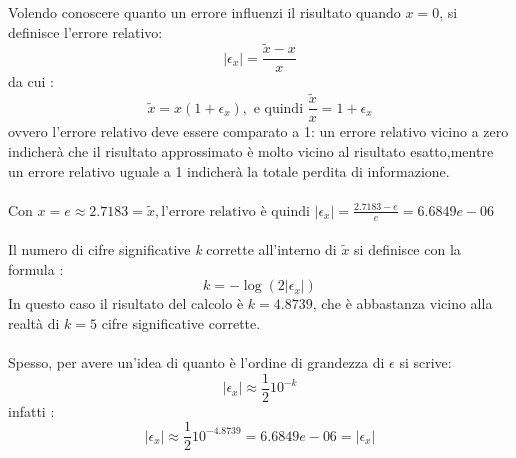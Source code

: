Volendo conoscere quanto un errore influenzi il risultato quando $x=0$, si definisce l’errore relativo:
	\[
	|\epsilon_x| = \frac{\tilde{x}-x}{x} 
	\]
da cui :
	\[
	\tilde{x} = x(1+\epsilon_x), \text{ e quindi } \frac{\tilde{x}}{x} = 1 + \epsilon_x
	\]
ovvero l’errore relativo deve essere comparato a 1: un errore relativo vicino a zero indicherà che il risultato approssimato è molto vicino al risultato esatto,mentre un errore relativo uguale a 1 indicherà la totale perdita di informazione.\\\\
Con $x = e \approx 2.7183 = \tilde{x}, \text{l'errore relativo è quindi } |\epsilon_x| = \frac{2.7183 - e}{e} = 6.6849e-06$\\\\
Il numero di cifre significative \textit{k} corrette all’interno di $\tilde{x}$ si definisce con la formula :
	\[
	\textit{k} = -\log(2|\epsilon_x|)
	\]
In questo caso il risultato del calcolo è $\textit{k}=4.8739$, che è abbastanza vicino alla realtà di $\textit{k}=5$ cifre significative corrette.\\\\
Spesso, per avere un’idea di quanto è l’ordine di grandezza di $\epsilon$ si scrive:
	\[
	|\epsilon_x| \approx \frac{1}{2}10^{-\textit{k}}
	\]
infatti : 
	\[
	|\epsilon_x| \approx \frac{1}{2}10^{-4.8739} = 6.6849e-06 = |\epsilon_x|
	\]